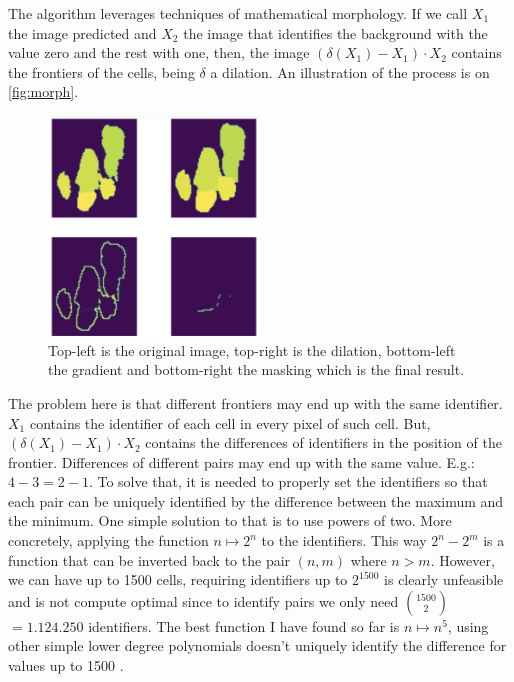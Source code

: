 The algorithm leverages techniques of mathematical morphology. If we call $X_1$ the image predicted and $X_2$ the image that identifies the background with the value zero and the rest with one, then, the image $(\delta (X_1) - X_1)  \cdot X_2$ contains the frontiers of the cells, being $\delta$ a dilation. An illustration of the process is on \autoref{fig:morph}.

\begin{figure}[ht]
    \centering
    \includegraphics[width=0.5\textwidth]{imgs/morphInflam.png}
    \caption{Top-left is the original image, top-right is the dilation, bottom-left the gradient and bottom-right the masking which is the final result.}
    \label{fig:morph}
\end{figure}

The problem here is that different frontiers may end up with the same identifier. $X_1$ contains the identifier of each cell in every pixel of such cell. But, $(\delta (X_1) - X_1)  \cdot X_2$ contains the differences of identifiers in the position of the frontier. Differences of different pairs may end up with the same value. E.g.: $4-3 = 2-1$. To solve that, it is needed to properly set the identifiers so that each pair can be uniquely identified by the difference between the maximum and the minimum. One simple solution to that is to use powers of two. More concretely, applying the function $n \mapsto 2^n$ to the identifiers. This way $2^n-2^m$ is a function that can be inverted back to the pair $(n,m)$ where $n>m$. However, we can have up to 1500 cells, requiring identifiers up to $2^{1500}$ is clearly unfeasible and is not compute optimal since to identify pairs we only need $1500 \choose 2$ $=1.124.250$ identifiers. The best function I have found so far is $n \mapsto n^5$, using other simple lower degree polynomials doesn't uniquely identify the difference for values up to 1500 \cite{4567383}.

